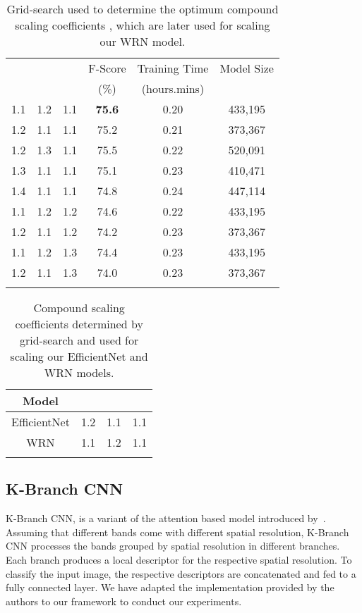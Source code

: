 \documentclass[journal]{IEEEtran}
\begin{document}
\begin{table}[b]
    \centering
    \begin{tabular}{ c c c c c c}
    \toprule
        \multirow{1}{*}{{}} &  &  & F-Score & Training Time  & Model Size \\
        & & & (\%) & (hours.mins) & \\
        \hline
        1.1 & 1.2 & 1.1 & \textbf{75.6} & 0.20 & 433,195\\
        \hline
        1.2 & 1.1 & 1.1 & 75.2 & 0.21 & 373,367\\
        \hline
        1.2 & 1.3 & 1.1 & 75.5 & 0.22 & 520,091\\
        \hline
        1.3 & 1.1 & 1.1 & 75.1 & 0.23 & 410,471\\
        \hline
        1.4 & 1.1 & 1.1 & 74.8 & 0.24 & 447,114\\
        \hline
        1.1 & 1.2 & 1.2 & 74.6 & 0.22 & 433,195\\
        \hline
        1.2 & 1.1 & 1.2 & 74.2 & 0.23 & 373,367\\
        \hline
        1.1 & 1.2 & 1.3 & 74.4 & 0.23 & 433,195\\
        \hline
        1.2 & 1.1 & 1.3 & 74.0 & 0.23 & 373,367\\
        \hline
        \bottomrule\\
    \end{tabular}
    \caption{ Grid-search used to determine the optimum compound scaling coefficients , which are later used for scaling our WRN model.} 
    \label{tab:WRNScalingCoeff}
\end{table}

\begin{table}[b]
    \centering
    \begin{tabular}{ c c c c}
    \toprule
        Model &  &  &  \\
        \hline
        EfficientNet & 1.2 & 1.1 & 1.1 \\
        \hline
        WRN & 1.1 & 1.2 & 1.1\\
        \hline
        \bottomrule\\
    \end{tabular}
    \caption{Compound scaling coefficients  determined by grid-search and used for scaling our EfficientNet and WRN models.} 
    \label{tab:CompScalingCoeff}
\end{table}





\subsection{K-Branch CNN}
K-Branch CNN, is a variant of the attention based model introduced by~\cite{sumbul2019novel}. Assuming that different bands come with different spatial resolution, K-Branch CNN processes the bands grouped by spatial resolution in different branches. Each branch produces a local descriptor for the respective spatial resolution. To classify the input image, the respective descriptors are concatenated and fed to a fully connected layer. We have adapted the implementation provided by the authors to our framework to conduct our experiments.
\end{document}
